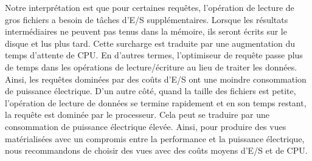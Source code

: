 Notre interprétation est que pour certaines requêtes, l'opération de lecture de gros fichiers a besoin de tâches d'E/S supplémentaires. Lorsque les résultats intermédiaires ne peuvent pas tenus dans la mémoire, ils seront écrits sur le disque et lus plus tard. Cette surcharge est traduite par une augmentation du temps d'attente de CPU. En d'autres termes, l'optimiseur de requête passe plus de temps dans les opérations de lecture/écriture au lieu de traiter les données. Ainsi, les requêtes dominées par des coûts d'E/S ont une moindre consommation de puissance électrique. D'un autre côté, quand la taille des fichiers est petite, l'opération de lecture de données se termine rapidement et en son temps restant, la requête est dominée par le processeur. Cela peut se traduire par une consommation de puissance électrique élevée. Ainsi, pour produire des vues matérialisées avec un compromis entre la performance et la puissance électrique, nous recommandons de choisir des vues avec des coûts moyens d'E/S et de CPU.


